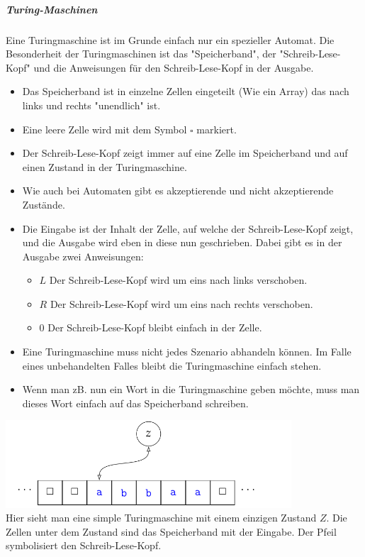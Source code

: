 \documentclass[12pt]{article}
\begin{document}
\subparagraph{\large Turing-Maschinen}
\normalsize
\begin{flushleft}
    Eine Turingmaschine ist im Grunde einfach nur ein spezieller Automat. Die Besonderheit der Turingmaschinen ist das "Speicherband", der
    "Schreib-Lese-Kopf" und die Anweisungen für den Schreib-Lese-Kopf in der Ausgabe.
    \begin{itemize}
        \item Das Speicherband ist in einzelne Zellen eingeteilt (Wie ein Array) das nach links und rechts "unendlich" ist.
        \item Eine leere Zelle wird mit dem Symbol $\square$ markiert.
        \item Der Schreib-Lese-Kopf zeigt immer auf eine Zelle im Speicherband und auf einen Zustand in der Turingmaschine.
        \item Wie auch bei Automaten gibt es akzeptierende und nicht akzeptierende Zustände.
        \item Die Eingabe ist der Inhalt der Zelle, auf welche der Schreib-Lese-Kopf zeigt, und die Ausgabe wird eben in diese nun geschrieben. Dabei gibt es in der Ausgabe zwei Anweisungen:
        \begin{itemize}
            \item $L$ Der Schreib-Lese-Kopf wird um eins nach links verschoben.
            \item $R$ Der Schreib-Lese-Kopf wird um eins nach rechts verschoben.
            \item $0$ Der Schreib-Lese-Kopf bleibt einfach in der Zelle.
        \end{itemize}
        \item Eine Turingmaschine muss nicht jedes Szenario abhandeln können. Im Falle eines unbehandelten Falles bleibt die Turingmaschine einfach stehen.
        \item Wenn man zB. nun ein Wort in die Turingmaschine geben möchte, muss man dieses Wort einfach auf das Speicherband schreiben.
    \end{itemize}
    \includegraphics[width=0.8\textwidth]{simple_turing.png} \\
    Hier sieht man eine simple Turingmaschine mit einem einzigen Zustand $Z$. Die Zellen unter dem Zustand sind das Speicherband mit der Eingabe. Der Pfeil symbolisiert den Schreib-Lese-Kopf.

\end{flushleft}
\end{document}
